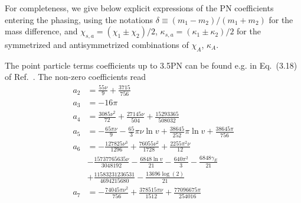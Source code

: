 \documentclass[prd,aps,letter,twocolumn,floatfix,notitlepage,nofootinbib]{revtex4-1}
\begin{document}
For completeness, we give below explicit expressions of the PN coefficients entering the phasing, using the notations $\delta \equiv (m_{1} - m_{2})/(m_{1} + m_{2})$ for the mass difference, and $\chi_{s,a} = (\chi_{1} \pm \chi_{2})/2$, $\kappa_{s,a} = (\kappa_{1} \pm \kappa_{2})/2$ for the symmetrized and antisymmetrized combinations of $\chi_{A}$, $\kappa_{A}$.

The point particle terms coefficients up to 3.5PN can be found e.g. in Eq.~(3.18) of Ref.~\cite{BuonannoIyerOchsner2009}. The non-zero coefficients read
\begin{align}
	a_{2} &= \frac{55 \nu }{9}+\frac{3715}{756} \nonumber\\
	a_{3} &= -16 \pi \nonumber\\
	a_{4} &= \frac{3085 \nu ^2}{72}+\frac{27145 \nu }{504}+\frac{15293365}{508032} \nonumber\\
	a_{5} &= -\frac{65 \pi  \nu }{9}-\frac{65}{3} \pi  \nu   \ln v +\frac{38645}{252} \pi   \ln v +\frac{38645 \pi }{756} \nonumber\\
	a_{6} &= -\frac{127825 \nu ^3}{1296}+\frac{76055 \nu ^2}{1728}+\frac{2255 \pi ^2 \nu }{12} \nonumber\\ 
	& -\frac{15737765635 \nu }{3048192}-\frac{6848  \ln v }{21}-\frac{640 \pi ^2}{3}-\frac{6848 \gamma_{E} }{21} \nonumber\\ 
	& +\frac{11583231236531}{4694215680}-\frac{13696 \log (2)}{21} \nonumber\\
	a_{7} &= -\frac{74045 \pi  \nu ^2}{756}+\frac{378515 \pi  \nu }{1512}+\frac{77096675 \pi }{254016}
\end{align}
\end{document}

